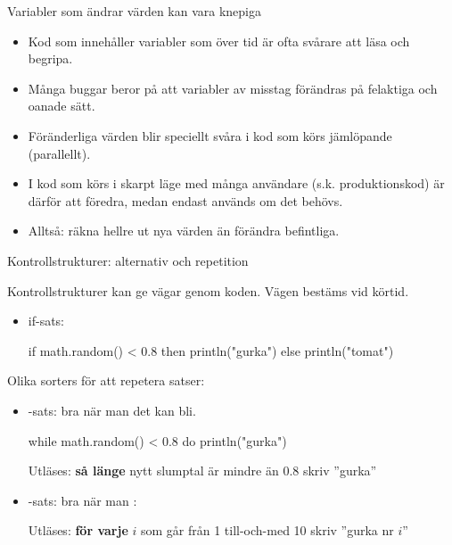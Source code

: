 \begin{Slide}{Variabler som ändrar värden kan vara knepiga}
\begin{itemize}
\item Kod som innehåller variabler som  över tid är ofta svårare att läsa och begripa.

\item Många buggar beror på att variabler av misstag förändras på felaktiga och oanade sätt.

\item Föränderliga värden blir speciellt svåra i kod som körs jämlöpande (parallellt).

\item I kod som körs i skarpt läge med många användare (s.k. produktionskod) är därför  att föredra, medan  endast används om det  behövs.
\item Alltså: räkna hellre ut nya värden än förändra befintliga.
\end{itemize}
\end{Slide}



\begin{Slide}{Kontrollstrukturer: alternativ och repetition}\SlideFontSmall

\ifkompendium
\ExplainControlStructure
\else
Kontrollstrukturer kan ge  vägar genom koden. Vägen bestäms vid körtid.
\fi

\begin{itemize}
\item if-sats:
\begin{Code}
if math.random() < 0.8 then println("gurka") else println("tomat")
\end{Code}
\end{itemize}

Olika sorters  för att repetera satser:
\begin{itemize}
\item {}-sats: bra när man  det kan bli.
\begin{Code}
while math.random() < 0.8 do println("gurka")
\end{Code}
Utläses: \textbf{så länge} nytt slumptal är mindre än $0.8$ skriv ''gurka''
\item {}-sats: bra när man :
Utläses: \textbf{för varje} $i$ som går från 1 till-och-med 10 skriv ''gurka nr $i$''
\end{itemize}
\end{Slide}

